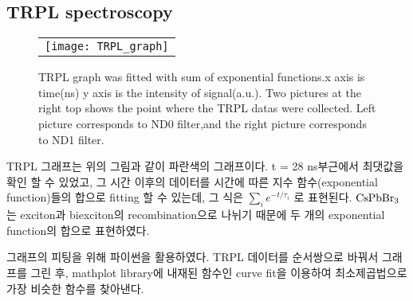 \subsection{TRPL spectroscopy}
\begin{figure}[h]
	\begin{center}
		\begin{tabular}{c}
			\texttt{[image: TRPL\_graph]}
		\end{tabular}
		\caption{TRPL graph was fitted with sum of exponential functions.x axis is time(ns) y axis is the intensity of signal(a.u.). Two pictures at the right top shows the point where the TRPL datas were collected. Left picture corresponds to ND0 filter,and the right picture corresponds to ND1 filter. }	
		\label{fig:FIR221}
	\end{center}
\end{figure}
TRPL 그래프는 위의 그림과 같이 파란색의 그래프이다. t = 28 ns부근에서 최댓값을 확인 할 수 있었고, 그 시간 이후의 데이터를 시간에 따른 지수 함수(exponential function)들의 합으로 fitting 할 수 있는데, 그 식은 $\sum_{i}^{} {e}^{-t/{\tau}_{i}}$ 로 표현된다. $\rm{CsPbBr_3}$는 exciton과 biexciton의 recombination으로 나뉘기 때문에 두 개의 exponential function의 합으로 표현하였다. 

그래프의 피팅을 위해 파이썬을 활용하였다. TRPL 데이터를 순서쌍으로 바꿔서 그래프를 그린 후, mathplot library에 내재된 함수인 curve fit을 이용하여 최소제곱법으로 가장 비슷한 함수를 찾아낸다.

